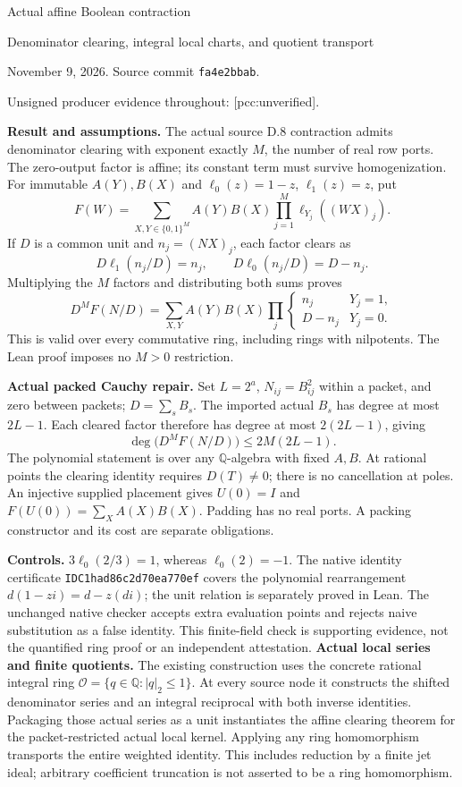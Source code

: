 \documentclass[11pt]{article}
\begin{document}
{\LARGE Actual affine Boolean contraction}\par
{\large Denominator clearing, integral local charts, and quotient transport}\par
November 9, 2026. Source commit \texttt{fa4e2bbab}.\par
Unsigned producer evidence throughout: [pcc:unverified].

\textbf{Result and assumptions.}
The actual source D.8 contraction admits denominator clearing with exponent
exactly $M$, the number of real row ports. The zero-output factor is affine;
its constant term must survive homogenization. For immutable $A(Y), B(X)$ and
$\ell_0(z)=1-z$, $\ell_1(z)=z$, put
\[
 F(W)=\sum_{X,Y\in\{0,1\}^M} A(Y)B(X)
       \prod_{j=1}^M\ell_{Y_j}((WX)_j).
\]
If $D$ is a common unit and $n_j=(NX)_j$, each factor clears as
\[
 D\ell_1(n_j/D)=n_j,\qquad
 D\ell_0(n_j/D)=D-n_j.
\]
Multiplying the $M$ factors and distributing both sums proves
\[
 D^M F(N/D)=\sum_{X,Y} A(Y)B(X)
       \prod_j\begin{cases}n_j&Y_j=1,\\D-n_j&Y_j=0.\end{cases}
\]
This is valid over every commutative ring, including rings with nilpotents.
The Lean proof imposes no $M>0$ restriction.

\textbf{Actual packed Cauchy repair.}
Set $L=2^a$, $N_{ij}=B_{ij}^2$ within a packet, and zero between packets;
$D=\sum_s B_s$. The imported actual $B_s$ has degree at most $2L-1$.
Each cleared factor therefore has degree at most $2(2L-1)$, giving
\[
 \deg\bigl(D^M F(N/D)\bigr)\leq 2M(2L-1).
\]
The polynomial statement is over any $\mathbb Q$-algebra with fixed $A,B$.
At rational points the clearing identity requires $D(T)\ne0$; there is no
cancellation at poles. An injective supplied placement gives $U(0)=I$ and
$F(U(0))=\sum_X A(X)B(X)$. Padding has no real ports. A packing constructor
and its cost are separate obligations.

\textbf{Controls.}
$3\ell_0(2/3)=1$, whereas $\ell_0(2)=-1$. The native identity certificate
\texttt{IDC1had86c2d70ea770ef} covers the polynomial rearrangement
$d(1-zi)=d-z(di)$; the unit relation is separately proved in Lean. The unchanged
native checker accepts extra evaluation points and rejects naive substitution
as a false identity. This finite-field check is supporting evidence, not the
quantified ring proof or an independent attestation.
\newpage
\textbf{Actual local series and finite quotients.}
The existing construction uses the concrete rational integral ring
$\mathcal O=\{q\in\mathbb Q:|q|_2\leq1\}$. At every source node it constructs
the shifted denominator series and an integral reciprocal with both inverse
identities. Packaging those actual series as a unit instantiates the affine
clearing theorem for the packet-restricted actual local kernel. Applying any
ring homomorphism transports the entire weighted identity. This includes
reduction by a finite jet ideal; arbitrary coefficient truncation is not
asserted to be a ring homomorphism.
\end{document}
